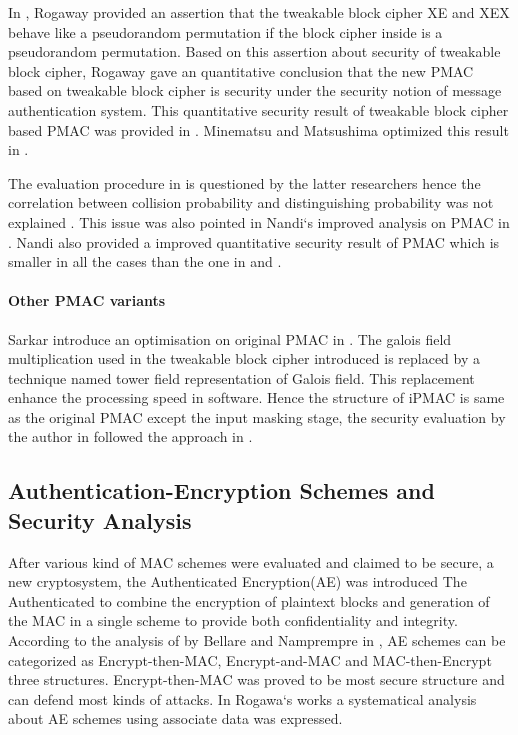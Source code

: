 \documentclass{article}
\begin{document}
In \cite{tweak_pmac}, Rogaway provided an assertion that the tweakable block cipher XE and XEX behave like a pseudorandom permutation if the block cipher inside is a pseudorandom permutation. Based on this assertion about security of tweakable block cipher, Rogaway gave an quantitative conclusion that the new PMAC based on tweakable block cipher is security under the security notion of message authentication system. This quantitative security result of tweakable block cipher based PMAC was provided in \cite{tweak_pmac}.
Minematsu and Matsushima optimized this result in \cite{new}. 

The evaluation procedure in \cite{pmac} is questioned by the latter researchers hence the correlation between collision probability and 
distinguishing probability was not explained . This issue was also pointed in Nandi`s improved analysis on PMAC in \cite{improve_pmac}. Nandi also provided a improved quantitative security result of PMAC which is smaller in all the cases than the one in \cite{pmac} and \cite{new}. 

\paragraph{Other PMAC variants}
Sarkar introduce an optimisation on original PMAC in \cite{iPMAC}. The galois field multiplication used in the tweakable block cipher introduced is replaced by a technique named tower field representation of Galois field. This replacement enhance the processing speed in software.
Hence the structure of iPMAC is same as the original PMAC except the input masking stage, the security evaluation by the author in \cite{iPMAC} followed the approach in \cite{pmac}.

\subsection{Authentication-Encryption Schemes and Security Analysis}
After various kind of MAC schemes were evaluated and claimed to be secure, a new cryptosystem, the Authenticated Encryption(AE) was introduced The Authenticated to combine the encryption of
plaintext blocks and generation of the MAC in a single scheme to provide both
confidentiality and integrity. According to the analysis of by Bellare and Namprempre in \cite{ae-notion}, AE schemes can be categorized as Encrypt-then-MAC, Encrypt-and-MAC and MAC-then-Encrypt three structures. Encrypt-then-MAC was proved to be most secure structure and can defend most kinds of attacks. 
In Rogawa`s works \cite{aead} a systematical analysis about AE
schemes using associate data was expressed.  
\end{document}

